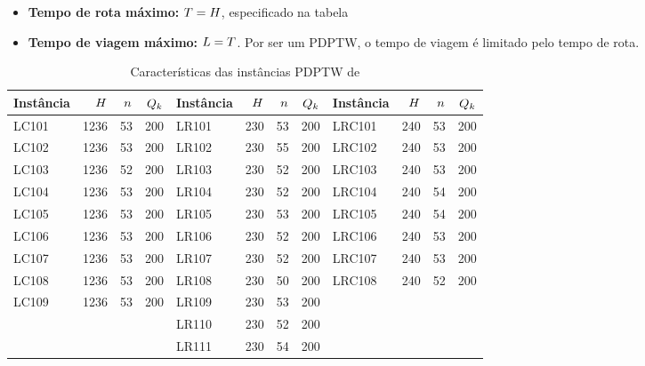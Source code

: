 \documentclass{anpet}
\begin{document}
\begin{itemize}
\begin{itemize}
    \end{itemize}
    \item \textbf{Tempo de rota máximo:} $T = H$, especificado na tabela
    \item \textbf{Tempo de viagem máximo:} $L = T$. Por ser um PDPTW, o tempo de viagem é limitado pelo tempo de rota.
\end{itemize}

\begin{table}[H]
    \centering
    \caption{Características das instâncias PDPTW de \textcite{li_metaheuristic_2003}}
    \label{tab:li_metaheuristics_2003_PDPTW_instances_characteristics}
    \begin{tabular}{lrrr|lrrr|lrrr}
        \toprule  
        Instância & $H$ & $n$ & $Q_{k}$ & Instância & $H$ & $n$ & $Q_{k}$ & Instância & $H$ & $n$ & $Q_{k}$ \\ 
        \midrule
        LC101      & 1236 &  53 & 200 & LR101      &  230 &  53 &  200 & LRC101      &  240 &  53 &  200\\
        LC102      & 1236 &  53 & 200 & LR102      &  230 &  55 &  200 & LRC102      &  240 &  53 &  200\\
        LC103      & 1236 &  52 & 200 & LR103      &  230 &  52 &  200 & LRC103      &  240 &  53 &  200\\
        LC104      & 1236 &  53 & 200 & LR104      &  230 &  52 &  200 & LRC104      &  240 &  54 &  200\\
        LC105      & 1236 &  53 & 200 & LR105      &  230 &  53 &  200 & LRC105      &  240 &  54 &  200\\
        LC106      & 1236 &  53 & 200 & LR106      &  230 &  52 &  200 & LRC106      &  240 &  53 &  200\\
        LC107      & 1236 &  53 & 200 & LR107      &  230 &  52 &  200 & LRC107      &  240 &  53 &  200\\
        LC108      & 1236 &  53 & 200 & LR108      &  230 &  50 &  200 & LRC108      &  240 &  52 &  200\\
        LC109      & 1236 &  53 & 200 & LR109      &  230 &  53 &  200 &             &      &     &     \\ 
                   &      &     &     & LR110      &  230 &  52 &  200 &             &      &     &     \\ 
                   &      &     &     & LR111      &  230 &  54 &  200 &             &      &     &     \\

\end{tabular}
\end{table}
\end{document}
